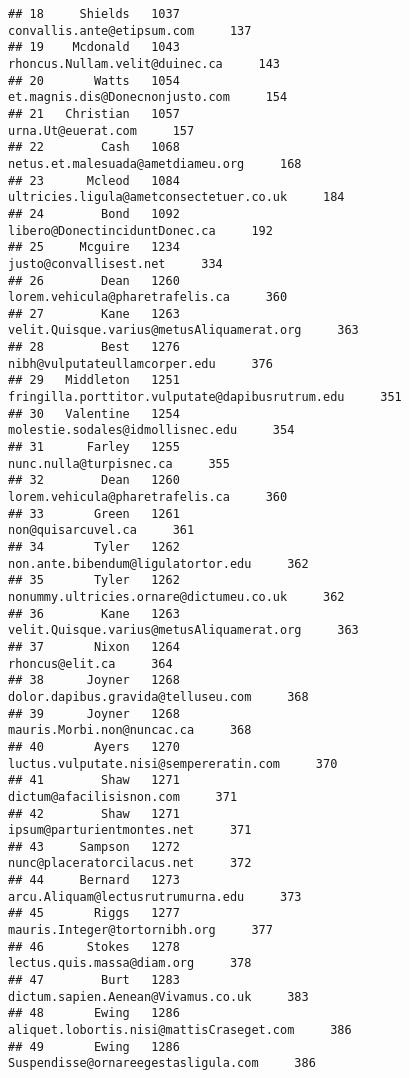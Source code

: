 \documentclass[
]{article}
\begin{document}
\begin{verbatim}
## 18     Shields   1037                        convallis.ante@etipsum.com     137
## 19    Mcdonald   1043                    rhoncus.Nullam.velit@duinec.ca     143
## 20       Watts   1054                   et.magnis.dis@Donecnonjusto.com     154
## 21   Christian   1057                                urna.Ut@euerat.com     157
## 22        Cash   1068                 netus.et.malesuada@ametdiameu.org     168
## 23      Mcleod   1084           ultricies.ligula@ametconsectetuer.co.uk     184
## 24        Bond   1092                     libero@DonectinciduntDonec.ca     192
## 25     Mcguire   1234                            justo@convallisest.net     334
## 26        Dean   1260                   lorem.vehicula@pharetrafelis.ca     360
## 27        Kane   1263         velit.Quisque.varius@metusAliquamerat.org     363
## 28        Best   1276                     nibh@vulputateullamcorper.edu     376
## 29   Middleton   1251   fringilla.porttitor.vulputate@dapibusrutrum.edu     351
## 30   Valentine   1254                  molestie.sodales@idmollisnec.edu     354
## 31      Farley   1255                           nunc.nulla@turpisnec.ca     355
## 32        Dean   1260                   lorem.vehicula@pharetrafelis.ca     360
## 33       Green   1261                                non@quisarcuvel.ca     361
## 34       Tyler   1262                non.ante.bibendum@ligulatortor.edu     362
## 35       Tyler   1262           nonummy.ultricies.ornare@dictumeu.co.uk     362
## 36        Kane   1263         velit.Quisque.varius@metusAliquamerat.org     363
## 37       Nixon   1264                                   rhoncus@elit.ca     364
## 38      Joyner   1268                dolor.dapibus.gravida@telluseu.com     368
## 39      Joyner   1268                        mauris.Morbi.non@nuncac.ca     368
## 40       Ayers   1270            luctus.vulputate.nisi@sempereratin.com     370
## 41        Shaw   1271                          dictum@afacilisisnon.com     371
## 42        Shaw   1271                        ipsum@parturientmontes.net     371
## 43     Sampson   1272                        nunc@placeratorcilacus.net     372
## 44     Bernard   1273                 arcu.Aliquam@lectusrutrumurna.edu     373
## 45       Riggs   1277                     mauris.Integer@tortornibh.org     377
## 46      Stokes   1278                        lectus.quis.massa@diam.org     378
## 47        Burt   1283                dictum.sapien.Aenean@Vivamus.co.uk     383
## 48       Ewing   1286          aliquet.lobortis.nisi@mattisCraseget.com     386
## 49       Ewing   1286               Suspendisse@ornareegestasligula.com     386

\end{verbatim}
\end{document}
